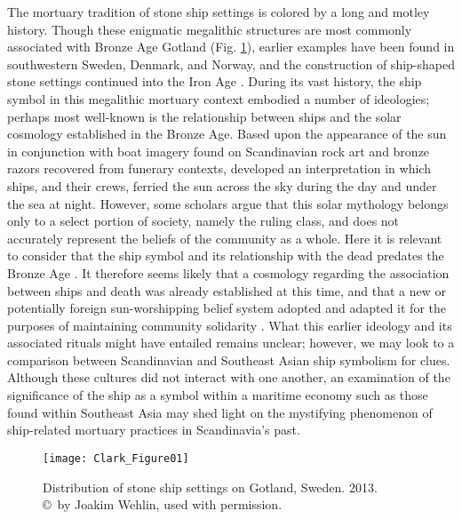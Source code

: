 The mortuary tradition of stone ship settings is colored by a long and motley history. Though these enigmatic megalithic structures are most commonly associated with Bronze Age Gotland (Fig. \ref{fig:Clark_Figure01}),
earlier examples have been found in southwestern Sweden, Denmark, and Norway, and the construction of ship-shaped stone settings continued into the Iron Age \parencite[92]{Wehlin_2010}.
During its vast history, the ship symbol in this megalithic mortuary context embodied a number of ideologies; perhaps most well-known is the relationship between ships and the solar cosmology established in the Bronze Age. Based upon the appearance of the sun in conjunction with boat imagery found on Scandinavian rock art and bronze razors recovered from funerary contexts, \textcite{Kaul_1998} developed an interpretation in which ships, and their crews, ferried the sun across the sky during the day and under the sea at night.
However, some scholars argue that this solar mythology belongs only to a select portion of society, namely the ruling class, and does not accurately represent the beliefs of the community as a whole. Here it is relevant to consider that the ship symbol and its relationship with the dead predates the Bronze Age \parencite[34]{Westerdahl_2005}.
It therefore seems likely that a cosmology regarding the association between ships and death was already established at this time, and that a new or potentially foreign sun-worshipping belief system adopted and adapted it for the purposes of maintaining community solidarity \parencites[212--213]{Skoglund_2009}[41--42]{Westerdahl_2015}.
What this earlier ideology and its associated rituals might have entailed remains unclear; however, we may look to a comparison between Scandinavian and Southeast Asian ship symbolism \parencite{Ballard_2004} for clues. Although these cultures did not interact with one another, an examination of the significance of the ship as a symbol within a maritime economy such as those found within Southeast Asia may shed light on the mystifying phenomenon of ship-related mortuary practices in Scandinavia’s past.

\begin{figure}[!htb]
	\texttt{[image: Clark\_Figure01]}
	\caption{Distribution of stone ship settings on Gotland, Sweden. 2013.
		{\normalfont\scriptsize \\ \copyright\ by Joakim Wehlin, used with permission.
	}}
	\label{fig:Clark_Figure01}
\end{figure}

